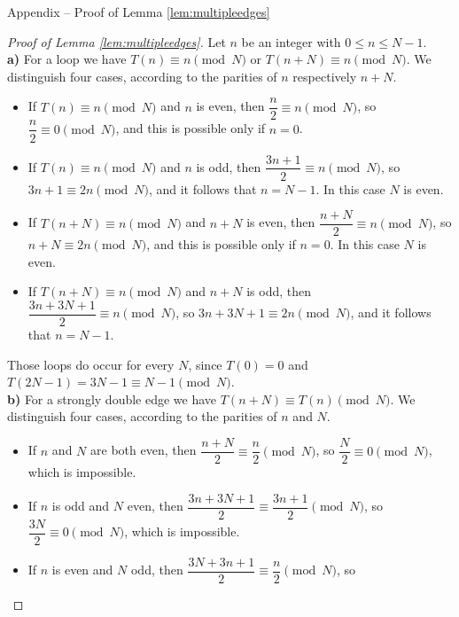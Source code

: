 \documentclass[10pt]{article}
\theoremstyle{definition}
\begin{document}
\appendix
\begin{section}{Appendix -- Proof of Lemma \ref{lem:multipleedges}}
{\footnotesize
    \begin{proof}[Proof of Lemma \ref{lem:multipleedges}]
        Let $ n $ be an integer with $ 0 \leq n \leq N-1 $. \\
        \textbf{a)} For a loop we have $ T(n) \equiv n \pmod{N} $ or $ T(n+N) \equiv n \pmod{N} $. We distinguish
        four cases, according to the parities of $ n $ respectively $ n + N $.
        \begin{itemize} \setlength{\itemsep}{0pt}
            \item If $ T(n) \equiv n \pmod{N} $ and $ n $ is even, then $ \dfrac{n}{2} \equiv n \pmod{N} $, so
            $ \dfrac{n}{2} \equiv 0 \pmod{N} $, and this is possible only if $ n = 0 $.
            \item If $ T(n) \equiv n \pmod{N} $ and $ n $ is odd, then $ \dfrac{3n+1}{2} \equiv n \pmod{N} $, so
            $ 3n+1 \equiv 2n \pmod{N} $, and it follows that $ n = N - 1 $. In this case $ N $ is even.
            \item If $ T(n+N) \equiv n \pmod{N} $ and $ n + N $ is even, then
            $ \dfrac{n+N}{2} \equiv n \pmod{N} $, so $ n + N \equiv 2n \pmod{N} $, and this is possible only
            if $ n = 0 $. In this case $ N $ is even.
            \item If $ T(n+N) \equiv n \pmod{N} $ and $ n + N $ is odd, then
            $ \dfrac{3n+3N+1}{2} \equiv n \pmod{N} $, so $ 3n + 3N + 1 \equiv 2n \pmod{N} $, and it follows
            that $ n = N - 1 $.
        \end{itemize}
        Those loops do occur for every $ N $, since $ T(0) = 0 $ and $ T(2N-1) = 3N-1 \equiv N-1 \pmod{N} $.
        \\
        \textbf{b)} For a strongly double edge we have $ T(n+N) \equiv T(n) \pmod{N} $. We distinguish four
        cases, according to the parities of $ n $ and $ N $.
        \begin{itemize} \setlength{\itemsep}{0pt}
            \item If $ n $ and $ N $ are both even, then $ \dfrac{n+N}{2} \equiv \dfrac{n}{2} \pmod{N} $, so
            $ \dfrac{N}{2} \equiv 0 \pmod{N} $, which is impossible.
            \item If $ n $ is odd and $ N $ even, then $ \dfrac{3n+3N+1}{2} \equiv \dfrac{3n+1}{2} \pmod{N} $,
            so $ \dfrac{3N}{2} \equiv 0 \pmod{N} $, which is impossible.
            \item If $ n $ is even and $ N $ odd, then $ \dfrac{3N+3n+1}{2} \equiv \dfrac{n}{2} \pmod{N} $, so

\end{itemize}
\end{proof}}
\end{section}
\end{document}
